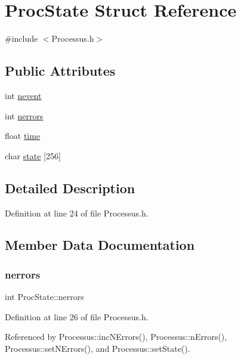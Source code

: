 \hypertarget{structProcState}{}\section{Proc\+State Struct Reference}
\label{structProcState}


{\ttfamily \#include $<$Processus.\+h$>$}

\subsection*{Public Attributes}
\begin{DoxyCompactItemize}
\item 
int \hyperlink{structProcState_a1881d6b0db849a8af15f586ad5959260}{nevent}
\item 
int \hyperlink{structProcState_a51a0f54ba62b07e07ac8518c5f32828d}{nerrors}
\item 
float \hyperlink{structProcState_a88c69b099d8f2b2164d478f28e87610f}{time}
\item 
char \hyperlink{structProcState_aaffb70e5af437e2c0d4dfc69bd0b24cd}{state} \mbox{[}256\mbox{]}
\end{DoxyCompactItemize}


\subsection{Detailed Description}


Definition at line 24 of file Processus.\+h.



\subsection{Member Data Documentation}
\mbox{\label{structProcState_a51a0f54ba62b07e07ac8518c5f32828d}} 
\subsubsection{\texorpdfstring{nerrors}{nerrors}}
{\footnotesize\ttfamily int Proc\+State\+::nerrors}



Definition at line 26 of file Processus.\+h.



Referenced by Processus\+::inc\+N\+Errors(), Processus\+::n\+Errors(), Processus\+::set\+N\+Errors(), and Processus\+::set\+State().

